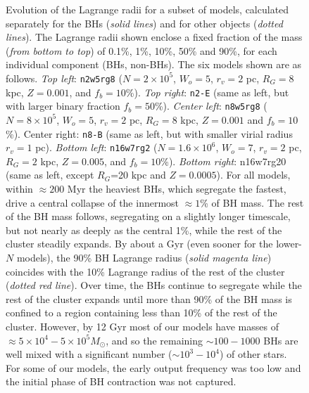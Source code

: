 \documentclass[12pt,preprint]{aastex}
\begin{document}





\begin{figure}[!h]
	\caption{Evolution of the Lagrange radii for a subset of models, calculated separately 
	for the BHs (\emph{solid lines}) and for other objects (\emph{dotted lines}). The Lagrange
	radii shown enclose a fixed fraction of the mass (\emph{from bottom to top}) of 0.1\%, 1\%, 
	10\%, 50\% and 90\%, for each individual component (BHs, non-BHs). The six models shown 
	are as follows. \emph{Top left}:  \texttt{n2w5rg8} ($N=2 \times 10^5$, $W_o=5$,  $r_v=2$ pc, 
	$R_G=8$ kpc, $Z=0.001$, and $f_b=10$\%). \emph{Top right}: \texttt{n2-E} (same as left, but 
	with larger binary fraction $f_b=50$\%). \emph{Center left}: \texttt{n8w5rg8} ($N=8 \times 10^5$, 
	$W_o=5$, $r_v=2$ pc, $R_G=8$ kpc, $Z=0.001$ and $f_b=10$\%). Center right: \texttt{n8-B} (same 
	as left, but with smaller virial radius $r_v=1$ pc). \emph{Bottom left}:  \texttt{n16w7rg2} 
	($N=1.6 \times 10^6$, $W_o=7$, $r_v=2$ pc,  $R_G=2$ kpc, $Z=0.005$, and $f_b=10$\%). 
	 \emph{Bottom right}: n16w7rg20 (same as left, except $R_G$=20 kpc and $Z=0.0005$).
	For all models, within $\approx 200$ Myr the heaviest BHs, which segregate the fastest, 
	drive a central collapse of the innermost $\approx 1$\% of  BH mass. The rest of the BH mass 
	follows, segregating on a slightly longer timescale, but not nearly as deeply as the central 1\%, while the rest of
	the cluster steadily expands. By about a Gyr (even sooner for the lower-$N$ models), the 90\% BH Lagrange 
	radius (\emph{solid magenta line}) coincides with the 10\% Lagrange radius of the rest of the cluster 
	(\emph{dotted red line}). Over time, the BHs continue to segregate while the rest of the cluster 
	expands until more than 90\% of the BH mass is confined to a region containing less than 10\% of 
	the rest of the cluster. However, by 12 Gyr most of our models have masses of $\approx 5 \times 10^4-
	5 \times 10^5 M_\odot$, and so the remaining $\sim 100-1000$ BHs are well
	mixed with a significant number ($\sim 10^3-10^4$) of other stars. 
	For some of our models, the early output frequency was too low and the
	initial phase of BH contraction was not captured.
	}
	
	\label{fig:LagRad}
\end{figure}
\end{document}
